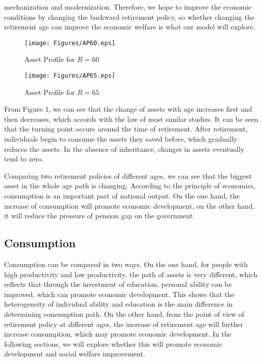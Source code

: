 \documentclass{article}
\begin{document}
        mechanization and modernization. Therefore, we hope to improve the economic conditions by changing the backward retirement policy, so whether changing the retirement age can improve the economic welfare is what our model will explore.
        \begin{figure}[H]
            \centering
            \texttt{[image: Figures/AP60.eps]}
            \caption{Asset Profile for $R=60$}
        \end{figure}
        \begin{figure}[H]
            \centering
            \texttt{[image: Figures/AP65.eps]}
            \caption{Asset Profile for $R=65$}
        \end{figure}
        From Figure 1, we can see that the change of assets with age increases first and then decreases, which accords with the law of most similar studies. It can be seen that the turning point occurs around the time of retirement. After retirement, individuals begin to consume the assets they saved before, which gradually reduces the assets. In the absence of inheritance, changes in assets eventually tend to zero.

        Comparing two retirement policies of different ages, we can see that the biggest asset in the whole age path is changing. According to the principle of economics, consumption is an important part of national output. On the one hand, the increase of consumption will promote economic development, on the other hand, it will reduce the pressure of pension gap on the government.
        
        
    \subsection{Consumption}
        Consumption can be compared in two ways. On the one hand, for people with high productivity and low productivity, the path of assets is very different, which reflects that through the investment of education, personal ability can be improved, which can promote economic development. This shows that the heterogeneity of individual ability and education is the main difference in determining consumption path. On the other hand, from the point of view of retirement policy at different ages, the increase of retirement age will further increase consumption, which may promote economic development. In the following sections, we will explore whether this will promote economic development and social welfare improvement.
        
\end{document}
